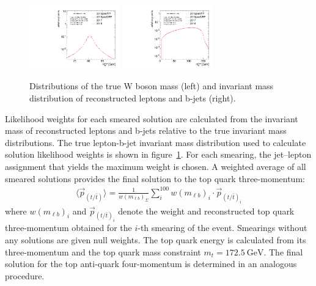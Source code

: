 \begin{figure}[htb]
    \begin{center}
        \includegraphics[width=0.35\textwidth]{fig_fullRun2UL/SmearingPlots/ULcomp_KinReco_W_mass_step0.pdf}
        \includegraphics[width=0.35\textwidth]{fig_fullRun2UL/SmearingPlots/ULcomp_KinReco_mbl_true_step0.pdf}
        \caption{\small Distributions of the true W boson mass (left) and invariant mass distribution of reconstructed leptons and b-jets (right).}
       \label{fig:inputDists}
    \end{center}
\end{figure}

Likelihood weights for each smeared solution are calculated from the invariant mass of reconstructed leptons and b-jets relative to the true invariant mass distributions.
The true lepton-b-jet invariant mass distribution used to calculate solution likelihood weights is shown in figure~\ref{fig:inputDists}.
For each smearing, the jet--lepton assignment that yields the maximum weight is chosen.
A weighted average of all smeared solutions provides the final solution to the top quark three-momentum:
\begin{align}
\langle \vec{p}_{(t / \bar{t})} \rangle = \frac{1}{w(m_{\ell b})_{\Sigma}} \sum_i^{100} w(m_{\ell b})_i \cdot \vec{p}_{(t / \bar{t})_i}
\end{align}
where $w(m_{\ell b})_i$ and $\vec{p}_{{(t / \bar{t})}_i}$ denote the weight and reconstructed top quark three-momentum obtained for the $i$-th smearing of the event.
Smearings without any solutions are given null weights.
The top quark energy is calculated from its three-momentum and the top quark mass constraint $m_{t} = \SI{172.5}{\GeV}$.
The final solution for the top anti-quark four-momentum is determined in an analogous procedure.

